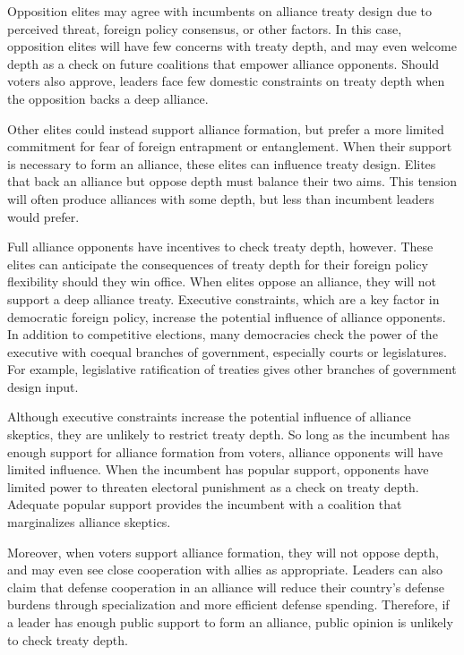\documentclass[12pt]{article}
\begin{document}
Opposition elites may agree with incumbents on alliance treaty design due to perceived threat, foreign policy consensus, or other factors. 
In this case, opposition elites will have few concerns with treaty depth, and may even welcome depth as a check on future coalitions that empower alliance opponents. 
Should voters also approve, leaders face few domestic constraints on treaty depth when the opposition backs a deep alliance. 


Other elites could instead support alliance formation, but prefer a more limited commitment for fear of foreign entrapment or entanglement. 
When their support is necessary to form an alliance, these elites can influence treaty design.
Elites that back an alliance but oppose depth must balance their two aims.
This tension will often produce alliances with some depth, but less than incumbent leaders would prefer.  


Full alliance opponents have incentives to check treaty depth, however.
These elites can anticipate the consequences of treaty depth for their foreign policy flexibility should they win office.
When elites oppose an alliance, they will not support a deep alliance treaty.  
Executive constraints, which are a key factor in democratic foreign policy, increase the potential influence of alliance opponents.   
In addition to competitive elections, many democracies check the power of the executive with coequal branches of government, especially courts or legislatures.
For example, legislative ratification of treaties gives other branches of government design input. 


Although executive constraints increase the potential influence of alliance skeptics, they are unlikely to restrict treaty depth. 
So long as the incumbent has enough support for alliance formation from voters, alliance opponents will have limited influence.
When the incumbent has popular support, opponents have limited power to threaten electoral punishment as a check on treaty depth. 
Adequate popular support provides the incumbent with a coalition that marginalizes alliance skeptics. 


Moreover, when voters support alliance formation, they will not oppose depth, and may even see close cooperation with allies as appropriate. 
Leaders can also claim that defense cooperation in an alliance will reduce their country's defense burdens through specialization and more efficient defense spending.  
Therefore, if a leader has enough public support to form an alliance, public opinion is unlikely to check treaty depth. 
\end{document}
